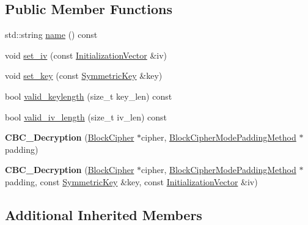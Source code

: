 \subsection*{Public Member Functions}
\begin{DoxyCompactItemize}
\item 
std\-::string \hyperlink{classBotan_1_1CBC__Decryption_aab105c0f27f09fc247b691e9ed651fed}{name} () const 
\item 
void \hyperlink{classBotan_1_1CBC__Decryption_a04c6a6b30cdd20c1910d078a2ebab4ec}{set\-\_\-iv} (const \hyperlink{namespaceBotan_ab6a07e859c4e3a2ccfd68308ec89497e}{Initialization\-Vector} \&iv)
\item 
void \hyperlink{classBotan_1_1CBC__Decryption_a10ec162c01cd44476805d72b694c2c6a}{set\-\_\-key} (const \hyperlink{namespaceBotan_a00c78597211d5c63b63e2a57ddb96d38}{Symmetric\-Key} \&key)
\item 
bool \hyperlink{classBotan_1_1CBC__Decryption_ad233ce4905980b91f098269b177f7468}{valid\-\_\-keylength} (size\-\_\-t key\-\_\-len) const 
\item 
bool \hyperlink{classBotan_1_1CBC__Decryption_ae123f9b15c895f6ba90bfc65c77915b8}{valid\-\_\-iv\-\_\-length} (size\-\_\-t iv\-\_\-len) const 
\item 
\hypertarget{classBotan_1_1CBC__Decryption_a8c5116fd086f6c2ecb815a55d9d42cd5}{{\bfseries C\-B\-C\-\_\-\-Decryption} (\hyperlink{classBotan_1_1BlockCipher}{Block\-Cipher} $\ast$cipher, \hyperlink{classBotan_1_1BlockCipherModePaddingMethod}{Block\-Cipher\-Mode\-Padding\-Method} $\ast$padding)}\label{classBotan_1_1CBC__Decryption_a8c5116fd086f6c2ecb815a55d9d42cd5}

\item 
\hypertarget{classBotan_1_1CBC__Decryption_aa8c5b4b32dc096f4e6b29404ef8f01c1}{{\bfseries C\-B\-C\-\_\-\-Decryption} (\hyperlink{classBotan_1_1BlockCipher}{Block\-Cipher} $\ast$cipher, \hyperlink{classBotan_1_1BlockCipherModePaddingMethod}{Block\-Cipher\-Mode\-Padding\-Method} $\ast$padding, const \hyperlink{namespaceBotan_a00c78597211d5c63b63e2a57ddb96d38}{Symmetric\-Key} \&key, const \hyperlink{namespaceBotan_ab6a07e859c4e3a2ccfd68308ec89497e}{Initialization\-Vector} \&iv)}\label{classBotan_1_1CBC__Decryption_aa8c5b4b32dc096f4e6b29404ef8f01c1}

\end{DoxyCompactItemize}
\subsection*{Additional Inherited Members}



